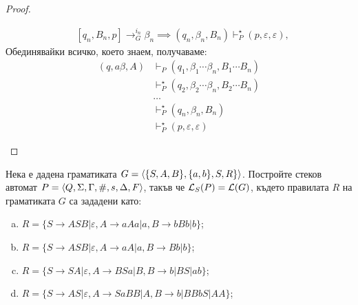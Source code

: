 \begin{proof}
\begin{enumerate}[1)]
\begin{description}
\begin{align*}
        & [q_n,B_n,p] \rightarrow^{i_n}_G \beta_n \implies (q_n,\beta_n,B_n) \vdash^\star_P (p,\varepsilon,\varepsilon),
      \end{align*}
      Обединявайки всичко, което знаем, получаваме:
      \begin{align*}
        (q, a\beta, A) & \vdash_P (q_1, \beta_1\cdots\beta_n, B_1\cdots B_n)\\
        & \vdash^\star_P (q_2, \beta_{2}\cdots\beta_n, B_2\cdots B_n)\\
        & \dots\\
        & \vdash^\star_P (q_n, \beta_n, B_n)\\
        & \vdash^\star_P (p, \varepsilon, \varepsilon)
      \end{align*}
    \end{description}
  \end{enumerate}
\end{proof}

\begin{problem}
  Нека е дадена граматиката $G = \langle{\{S,A,B\},\{a,b\},S,R\}}\rangle$.
  Постройте стеков автомат $P = \langle{Q,\Sigma,\Gamma,\#,s,\Delta,F}\rangle$, такъв че $\mathcal{L}_S(P) = \mathcal{L}(G)$, където правилата $R$ на граматиката $G$ са зададени като:
  \begin{enumerate}[a)]
  \item
    $R = \{S\rightarrow ASB\vert \varepsilon, A\rightarrow aAa\vert a, B\rightarrow bBb\vert b\}$;
  \item
    $R = \{S\rightarrow ASB\vert \varepsilon, A\rightarrow aA\vert a, B\rightarrow Bb\vert b\}$;
  \item
    $R =\{S\rightarrow SA|\varepsilon,A\rightarrow BSa|B, B\rightarrow b|BS|ab\}$;
  \item
    $R = \{S\rightarrow AS|\varepsilon,A\rightarrow SaBB|A, B\rightarrow b|BBbS|AA\}$;
  \end{enumerate}
\end{problem}


